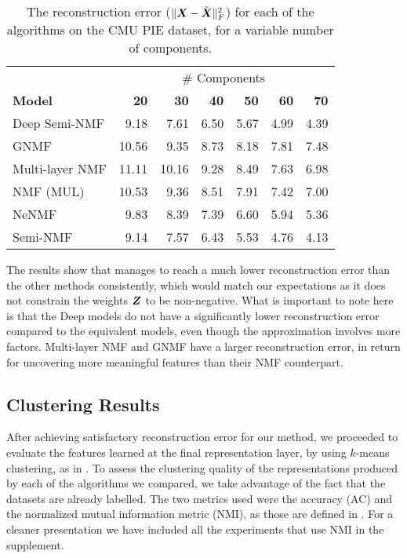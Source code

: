 \documentclass[10pt,journal,compsoc]{IEEEtran}
\providecommand{\norm}[1]{\lVert#1\rVert}
\begin{document}
\begin{table}[hptb]\label{tab:reconstruction_error}
\renewcommand{\arraystretch}{1.1}
\small
\begin{tabular}{l|rrrrrr}
 & \multicolumn{6}{c}{\# Components} \\ \cline{2-7}
 \bfseries Model &  \bfseries  20 &  \bfseries   30 &  \bfseries  40 &  \bfseries  50 &  \bfseries  60 & \bfseries   70 \\
\midrule\midrule
 Deep Semi-NMF   &   9.18 &   7.61 &  6.50 &  5.67 &  4.99 &  4.39 \\
 GNMF            &  10.56 &   9.35 &  8.73 &  8.18 &  7.81 &  7.48 \\
 Multi-layer NMF &  11.11 &  10.16 &  9.28 &  8.49 &  7.63 &  6.98 \\
 NMF (MUL)       &  10.53 &   9.36 &  8.51 &  7.91 &  7.42 &  7.00 \\
 NeNMF           &   9.83 &   8.39 &  7.39 &  6.60 &  5.94 &  5.36 \\
 Semi-NMF        &   9.14 &   7.57 &  6.43 &  5.53 &  4.76 &  4.13 \\
 \midrule
\bottomrule
\end{tabular}
\caption{The reconstruction error ($\norm{\bs X - \tilde{\bs X}}^2_F$) for each of the algorithms on the CMU PIE dataset, for a variable number of components.}
\end{table}

The results show that \seminmf manages to reach a much lower reconstruction error than the other methods consistently, which would match our expectations as it does not constrain the weights $\boldsymbol Z$ to be non-negative. What is important to note here is that the Deep \seminmf models do not have a significantly lower reconstruction error compared to the equivalent \seminmf models, even though the approximation involves more factors. Multi-layer NMF and GNMF have a larger reconstruction error, in return for uncovering more meaningful features than their NMF counterpart.

\subsection{Clustering Results}
After achieving satisfactory reconstruction error for our method, we proceeded to evaluate the features learned at the final representation layer, by using $k$-means clustering, as in \cite{cai2011graph}. To assess the clustering quality of the representations produced by each of the algorithms we compared, we take advantage of the fact that the datasets are already labelled. The two metrics used were the accuracy (AC) and the normalized mutual information metric (NMI), as those are defined in \cite{xu2003document}. For a cleaner presentation we have included all the experiments that use NMI in the supplement.
\end{document}
